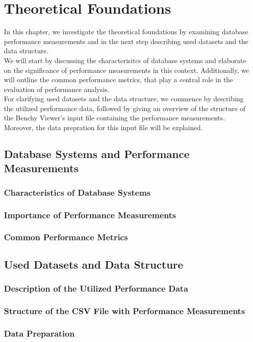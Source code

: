 
\chapter{Theoretical Foundations}\label{chapter:theoreticalFoundacions}

In this chapter, we investigate the theoretical foundations by examining database performance measurements and in the next step describing used datasets and the data structure.\\We will start by discussing the characterisitcs of database systems and elaborate on the significance of performance measurements in this context. Additionally, we will outline the common performance metrics, that play a central role in the evaluation of performance analysis.
\\ For clarifying used datasets and the data structure, we commence by describing the utilized performance data, followed by giving an overview of the structure of the Benchy Viewer's input file containing the performance measurements. Moreover, the data prepration for this input file will be explained.

\section{Database Systems and Performance Measurements}
\subsection{Characteristics of Database Systems}
\subsection{Importance of Performance Measurements}
\subsection{Common Performance Metrics}

\section{Used Datasets and Data Structure}
\subsection{Description of the Utilized Performance Data}
\subsection{Structure of the CSV File with Performance Measurements}
\subsection{Data Preparation}


